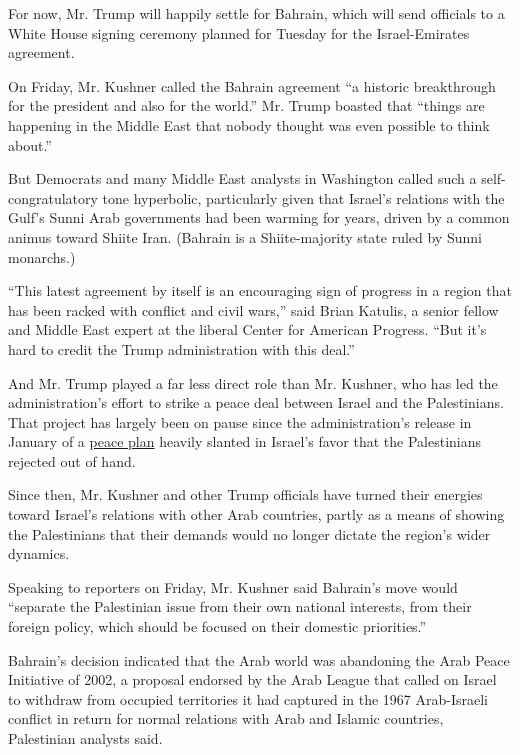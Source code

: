 For now, Mr. Trump will happily settle for Bahrain, which will send
officials to a White House signing ceremony planned for Tuesday for the
Israel-Emirates agreement.

On Friday, Mr. Kushner called the Bahrain agreement ``a historic
breakthrough for the president and also for the world.'' Mr. Trump
boasted that ``things are happening in the Middle East that nobody
thought was even possible to think about.''

But Democrats and many Middle East analysts in Washington called such a
self-congratulatory tone hyperbolic, particularly given that Israel's
relations with the Gulf's Sunni Arab governments had been warming for
years, driven by a common animus toward Shiite Iran. (Bahrain is a
Shiite-majority state ruled by Sunni monarchs.)

``This latest agreement by itself is an encouraging sign of progress in
a region that has been racked with conflict and civil wars,'' said Brian
Katulis, a senior fellow and Middle East expert at the liberal Center
for American Progress. ``But it's hard to credit the Trump
administration with this deal.''

And Mr. Trump played a far less direct role than Mr. Kushner, who has
led the administration's effort to strike a peace deal between Israel
and the Palestinians. That project has largely been on pause since the
administration's release in January of a
\href{https://www.nytimes3xbfgragh.onion/2020/01/28/world/middleeast/peace-plan.html}{peace
plan} heavily slanted in Israel's favor that the Palestinians rejected
out of hand.

Since then, Mr. Kushner and other Trump officials have turned their
energies toward Israel's relations with other Arab countries, partly as
a means of showing the Palestinians that their demands would no longer
dictate the region's wider dynamics.

Speaking to reporters on Friday, Mr. Kushner said Bahrain's move would
``separate the Palestinian issue from their own national interests, from
their foreign policy, which should be focused on their domestic
priorities.''

Bahrain's decision indicated that the Arab world was abandoning the Arab
Peace Initiative of 2002, a proposal endorsed by the Arab League that
called on Israel to withdraw from occupied territories it had captured
in the 1967 Arab-Israeli conflict in return for normal relations with
Arab and Islamic countries, Palestinian analysts said.


